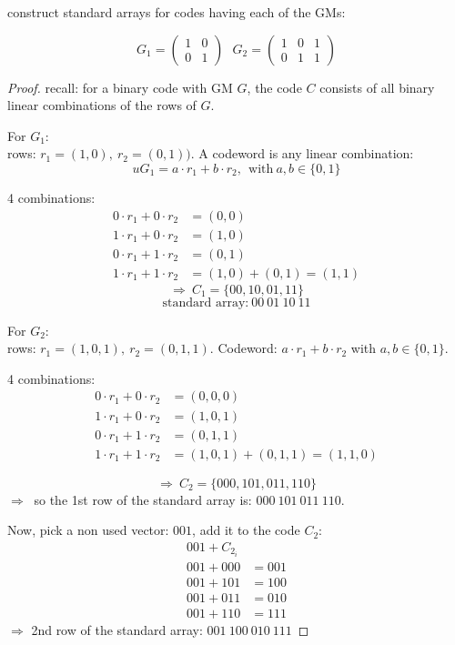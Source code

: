 \documentclass{article}
\theoremstyle{definition}
\newenvironment{ex}[1]
{\renewcommand\theinnerex{#1}\innerex}
{\endinnerex}
\begin{document}
\begin{ex}{6.1}
  construct standard arrays for codes having each of the GMs:

  $$G_1 = \begin{pmatrix}
    1 & 0 \\
    0 & 1
    \end{pmatrix} ~~~
    G_2 = \begin{pmatrix}
      1 & 0 & 1\\
      0 & 1 & 1
        \end{pmatrix}
    $$
\end{ex}
\begin{proof}
  recall: for a binary code with GM $G$, the code $C$ consists of all binary linear combinations of the rows of $G$.

  For $G_1$:\\
  rows: $r_1=(1,0),~r_2=(0,1))$. A codeword is any linear combination:
  $$u G_1= a \cdot r_1 + b \cdot r_2,~~ \text{with}~ a,b \in \{0,1\}$$

  4 combinations:
  \begin{align*}
    0 \cdot r_1 + 0 \cdot r_2 &= (0,0)\\
    1 \cdot r_1 + 0 \cdot r_2 &= (1,0)\\
    0 \cdot r_1 + 1 \cdot r_2 &= (0,1)\\
    1 \cdot r_1 + 1 \cdot r_2 &= (1,0)+(0,1) = (1,1)
  \end{align*}
  $$\Longrightarrow~ C_1 = \{00, 10, 01, 11\}$$
  $$\text{standard array:}~ 00~01~10~11$$


  \vspace{0.5cm}
  For $G_2$:\\
  rows: $r_1=(1, 0, 1),~ r_2=(0, 1, 1)$. Codeword: $a \cdot r_1 + b \cdot r_2$ with $a, b \in \{0,1\}$.

  4 combinations:
  \begin{align*}
    0 \cdot r_1 + 0 \cdot r_2 &= (0,0,0)\\
    1 \cdot r_1 + 0 \cdot r_2 &= (1,0,1)\\
    0 \cdot r_1 + 1 \cdot r_2 &= (0,1,1)\\
    1 \cdot r_1 + 1 \cdot r_2 &= (1,0,1)+(0,1,1) = (1,1,0)
  \end{align*}

  $$\Longrightarrow~ C_2 = \{000, 101, 011, 110\}$$
  $\Longrightarrow~$ so the 1st row of the standard array is: $000~101~011~110$.

  Now, pick a non used vector: $001$, add it to the code $C_2$:
  \begin{align*}
    001 + C_{2_i}&\\
    001 + 000 &= 001\\
    001 + 101 &= 100\\
    001 + 011 &= 010\\
    001 + 110 &= 111
  \end{align*}
  $\Longrightarrow$ 2nd row of the standard array: $001~100~010~111$


\end{proof}
\end{document}
